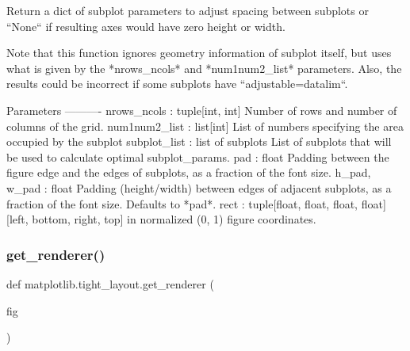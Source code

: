 \begin{DoxyVerb}Return a dict of subplot parameters to adjust spacing between subplots
or ``None`` if resulting axes would have zero height or width.

Note that this function ignores geometry information of subplot
itself, but uses what is given by the *nrows_ncols* and *num1num2_list*
parameters.  Also, the results could be incorrect if some subplots have
``adjustable=datalim``.

Parameters
----------
nrows_ncols : tuple[int, int]
    Number of rows and number of columns of the grid.
num1num2_list : list[int]
    List of numbers specifying the area occupied by the subplot
subplot_list : list of subplots
    List of subplots that will be used to calculate optimal subplot_params.
pad : float
    Padding between the figure edge and the edges of subplots, as a
    fraction of the font size.
h_pad, w_pad : float
    Padding (height/width) between edges of adjacent subplots, as a
    fraction of the font size.  Defaults to *pad*.
rect : tuple[float, float, float, float]
    [left, bottom, right, top] in normalized (0, 1) figure coordinates.
\end{DoxyVerb}
 \mbox{\label{namespacematplotlib_1_1tight__layout_a76e234291b6f43abf23322624f19cd6f}} 
\subsubsection{\texorpdfstring{get\+\_\+renderer()}{get\_renderer()}}
{\footnotesize\ttfamily def matplotlib.\+tight\+\_\+layout.\+get\+\_\+renderer (\begin{DoxyParamCaption}\item[{}]{fig }\end{DoxyParamCaption})}

\mbox{\label{namespacematplotlib_1_1tight__layout_ad7e4bbde66af2565e3d7f870913c87f8}} 
